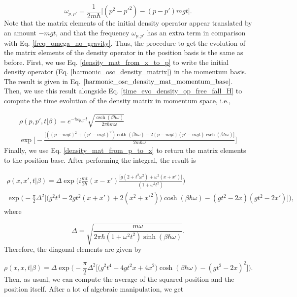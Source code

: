 \documentclass{article}
\DeclareMathOperator{\csch}{csch}
\begin{document}
\begin{equation}
    \omega_{p,p'} = \frac{1}{2m\hbar} \big[ (p^{2}-p'^{2})-(p-p')mgt \big].
\end{equation}
%
Note that the matrix elements of the initial density operator appear translated by an amount $-mgt$, and that the frequency $\omega_{p,p'}$ has an extra term in comparison with Eq. \ref{freq_omega_no_gravity}. Thus, the procedure to get the evolution of the matrix elements of the density operator in the position basis is the same as before. First, we use Eq. \ref{density_mat_from_x_to_p} to write the initial density operator (Eq. \ref{harmonic_osc_density_matrix}) in the momentum basis. The result is given in Eq. $\ref{harmonic_osc_density_mat_momentum_base}$. Then, we use this result alongside Eq. \ref{time_evo_density_op_free_fall_H} to compute the time evolution of the density matrix in momentum space, i.e.,

\begin{multline}
    \rho(p,p',t|\beta) = e^{-i\omega_{p,p'} t} \sqrt{\frac{\csch(\beta \hbar \omega)}{2\pi \hbar m \omega}} \\ 
    \exp \bigg[ -\frac{\big[ ((p-mgt)^{2}+(p'-mgt)^{2})\coth(\beta \hbar \omega) - 2(p-mgt)(p'-mgt)\csch(\beta \hbar \omega) \big]}{2m\hbar \omega} \bigg]
\end{multline}
%
Finally, we use Eq. \ref{density_mat_from_p_to_x} to return the matrix elements to the position base. After performing the integral, the result is

\begin{multline}
    \rho(x,x',t|\beta) = \Delta \exp \bigg(i \frac{mt}{2\hbar} (x-x') \frac{\big[g(2+t^{2}\omega^{2})+\omega^{2}(x+x')\big]}{(1+ \omega^{2}t^{2})} \bigg) \\
    \exp \bigg( -\frac{\pi}{2} \Delta^{2} \Big[ \big( g^{2} t^{4} - 2g t^{2}(x+x') + 2(x^{2}+x'^{2}) \big)\cosh(\beta \hbar \omega) - (g t^{2} - 2x)(g t^{2} - 2x') \Big] \bigg),
\end{multline}
%
where

\begin{equation}
    \Delta = \sqrt{\frac{m\omega}{2\pi \hbar (1+ \omega^{2}t^{2}) \sinh (\beta \hbar \omega)}}.
\end{equation}
%
Therefore, the diagonal elements are given by

\begin{equation}
    \rho(x,x,t|\beta) = \Delta \exp \bigg( -\frac{\pi}{2} \Delta^{2} \Big[ \big( g^{2} t^{4} - 4g t^{2}x + 4x^{2} \big)\cosh(\beta \hbar \omega) - (g t^{2} - 2x)^{2} \Big] \bigg).
\end{equation}
%
Then, as usual, we can compute the average of the squared position and the position itself. After a lot of algebraic manipulation, we get
\end{document}
